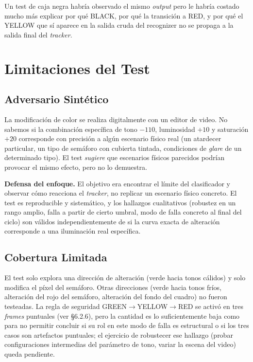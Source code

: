 Un test de caja negra habría observado el mismo \textit{output} pero le habría costado mucho más explicar por qué BLACK, por qué la transición a RED, y por qué el YELLOW que sí aparece en la salida cruda del recognizer no se propaga a la salida final del \textit{tracker}.

\section{Limitaciones del Test}

\subsection{Adversario Sintético}

La modificación de color se realiza digitalmente con un editor de video. No sabemos si la combinación específica de tono $-110$, luminosidad $+10$ y saturación $+20$ corresponde con precisión a algún escenario físico real (un atardecer particular, un tipo de semáforo con cubierta tintada, condiciones de \textit{glare} de un determinado tipo). El test \textit{sugiere} que escenarios físicos parecidos podrían provocar el mismo efecto, pero no lo demuestra.

\textbf{Defensa del enfoque.} El objetivo era encontrar el límite del clasificador y observar cómo reacciona el \textit{tracker}, no replicar un escenario físico concreto. El test es reproducible y sistemático, y los hallazgos cualitativos (robustez en un rango amplio, falla a partir de cierto umbral, modo de falla concreto al final del ciclo) son válidos independientemente de si la curva exacta de alteración corresponde a una iluminación real específica.

\subsection{Cobertura Limitada}

El test solo explora una dirección de alteración (verde hacia tonos cálidos) y solo modifica el píxel del semáforo. Otras direcciones (verde hacia tonos fríos, alteración del rojo del semáforo, alteración del fondo del cuadro) no fueron testeadas. La regla de seguridad GREEN$\to$YELLOW$\to$RED se activó en tres \textit{frames} puntuales (ver \S6.2.6), pero la cantidad es lo suficientemente baja como para no permitir concluir si su rol en este modo de falla es estructural o si los tres casos son artefactos puntuales; el ejercicio de robustecer ese hallazgo (probar configuraciones intermedias del parámetro de tono, variar la escena del video) queda pendiente.

